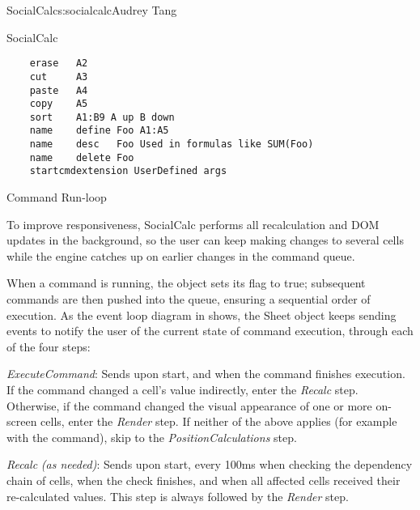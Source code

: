 \begin{aosachapter}{SocialCalc}{s:socialcalc}{Audrey Tang}
\begin{aosasect1}{SocialCalc}
\begin{table}[ht]
\begin{minipage}[b]{0.6\linewidth}
\begin{verbatim}
    erase   A2
    cut     A3
    paste   A4
    copy    A5
    sort    A1:B9 A up B down
    name    define Foo A1:A5
    name    desc   Foo Used in formulas like SUM(Foo)
    name    delete Foo
    startcmdextension UserDefined args
\end{verbatim}

\end{minipage}
\caption{SocialCalc Commands}
\label{tbl.soc.commands}
\end{table}

\end{aosasect1}

\begin{aosasect1}{Command Run-loop}

To improve responsiveness, SocialCalc performs all recalculation and
DOM updates in the background, so the user can keep making changes to
several cells while the engine catches up on earlier changes in the
command queue.


When a command is running, the  object sets its
 flag to true; subsequent commands are then pushed into the
 queue, ensuring a sequential order of
execution.  As the event loop diagram in 
shows, the Sheet object keeps sending  events to
notify the user of the current state of command execution, through
each of the four steps:

\begin{aosadescription}

  \item{\emph{ExecuteCommand}}: Sends  upon start, and
    when the command finishes execution.  If the command
   changed a cell's value indirectly, enter the \emph{Recalc} step.
   Otherwise, if the command changed the visual appearance of one or
   more on-screen cells, enter the \emph{Render} step.  If neither of
   the above applies (for example with the  command), skip
   to the \emph{PositionCalculations} step.

\pagebreak

  \item{\emph{Recalc}} \emph{(as{ }needed)}: Sends  upon start,
   every 100ms when checking the dependency chain of
  cells,  when the check finishes, and
   when all affected cells received their
  re-calculated values.  This step is always followed by the \emph{Render}
  step.


\end{aosadescription}
\end{aosasect1}
\end{aosachapter}
